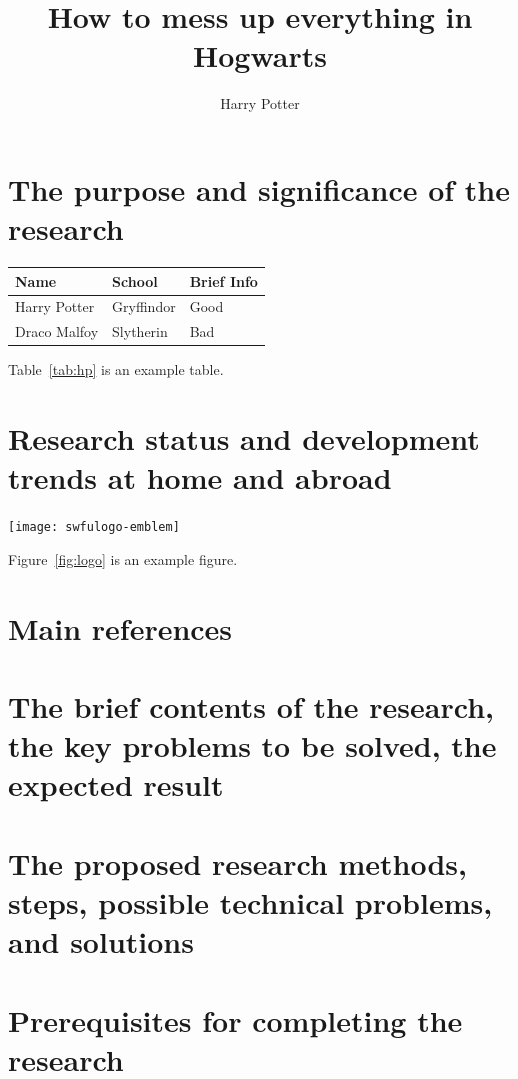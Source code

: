 \documentclass{swfuproposale}
\title{How to mess up everything in Hogwarts}
\author{Harry Potter}
\begin{document}
\front{}

\section{The purpose and significance of the research}

\lipsum[1]
\begin{center}\singlespacing
  \begin{tabular}{lll}
    \toprule
    Name&School&Brief Info\\\midrule
    Harry Potter&Gryffindor&Good\\
    Draco Malfoy&Slytherin&Bad\\\bottomrule
  \end{tabular}      
\end{center}
Table~\ref{tab:hp} is an example table. \lipsum[2]

\section{Research status and development trends at home and abroad}

\lipsum[3]
\begin{center}
  \texttt{[image: swfulogo-emblem]}%
\end{center}
Figure~\ref{fig:logo} is an example figure. \lipsum[4]

\section{Main references}
  
\nocite{*} \printbibliography[heading=none]%

\section{The brief contents of the research, the key problems to be solved, the expected result}

\lipsum[5-6]

\section{The proposed research methods, steps, possible technical problems, and solutions}

\lipsum[7-8]

\section{Prerequisites for completing the research}

\lipsum[9]

\mktail{}
\end{document}
